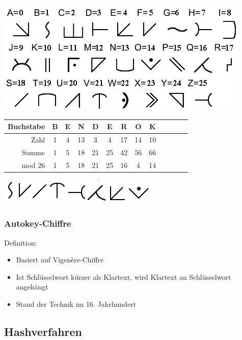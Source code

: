 \begin{frame}
\begin{center}
	\includegraphics[width=.5\textwidth]{autokey_chiffre.png}
\end{center}

\begin{longtable}{|r|c|c|c|c|c|c|c|c|c|c|c|c|}
\hline
Buchstabe & B & E &  N &  D &  E &  R &  O &  K\\\hline
Zahl      & 1 & 4 & 13 &  3 &  4 & 17 & 14 & 10\\\hline
Summe     & 1 & 5 & 18 & 21 & 25 & 42 & 56 & 66\\\hline
mod 26    & 1 & 5 & 18 & 21 & 25 & 16 &  4 & 14\\\hline
\end{longtable}

\begin{center}
	\includegraphics[width=.4\textwidth]{bender_ok.png}
\end{center}

\end{frame}

\begin{frame}
\frametitle{Autokey-Chiffre}
\begin{block}{Definition:}
\begin{itemize}
	\item Basiert auf Vigenère-Chiffre
	\item Ist Schlüsselwort kürzer als Klartext, wird Klartext an Schlüsselwort angehängt
	\item Stand der Technik im 16. Jahrhundert
\end{itemize}
\end{block}
\end{frame}

\subsection{Hashverfahren}

